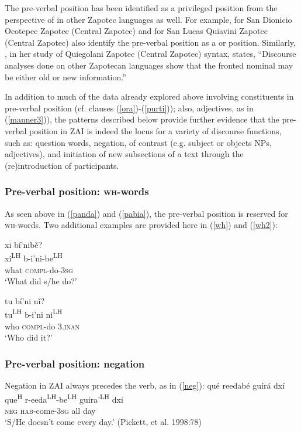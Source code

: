 The pre-verbal position has been identified as a privileged position from the perspective of  in other Zapotec languages as well. For example, \citet{broadwell2002} for San Dionicio Ocotepec Zapotec (Central Zapotec) and \citet{lee2000} for San Lucas Quiavini Zapotec (Central Zapotec) also identify the pre-verbal position as a  or  position. Similarly, \citet[103]{black2000}, in her study of Quiegolani Zapotec (Central Zapotec) syntax, states, ``Discourse analyses done on other Zapotecan languages show that the fronted nominal may be either old or new information.'' 

In addition to much of the data already explored above involving constituents in pre-verbal position (cf.  clauses (\ref{ora})-(\ref{purti})); also, adjectives, as in  (\ref{manner3})), the patterns described below provide further evidence that the pre-verbal position in ZAI is indeed the locus for a variety of discourse functions, such as: question words, negation,  of contrast (e.g. subject or objects NPs, adjectives), and initiation of new subsections of a text through the (re)introduction of participants.

\subsubsection{Pre-verbal position: \textsc{wh}-words}
As seen above in (\ref{panda}) and (\ref{pabia}), the pre-verbal position is reserved for \textsc{wh}-words. Two additional examples are provided here in (\ref{wh}) and (\ref{wh2}): 

\ea\label{wh}
xi b\'{i}'nib\v{e}? \\
xi\textsuperscript{LH} b-i'ni-be\textsuperscript{LH} \\
what \textsc{compl}-do-3\textsc{sg} \\
\glt `What did s/he do?' 
\z

\ea\label{wh2}
tu b\'{i}'ni n\v{i}? \\
tu\textsuperscript{LH} b-i'ni ni\textsuperscript{LH} \\
who \textsc{compl}-do 3.\textsc{inan} \\
\glt `Who did it?'  
\z

\subsubsection{Pre-verbal position: negation}
Negation in ZAI always precedes the verb, as in (\ref{neg}):
\ea\label{neg}
\glll qu\'{e} reedab\'{e} gu\'{i}r\'{a} dx\'{i} \\
 que\textsuperscript{H} r-eeda\textsuperscript{LH}-be\textsuperscript{LH} guira'\textsuperscript{LH} dxi \\
\textsc{neg} \textsc{hab}-come-3\textsc{sg} all day \\
\glt `S/He doesn't come every day.' \hfill (Pickett, et al. 1998:78)

